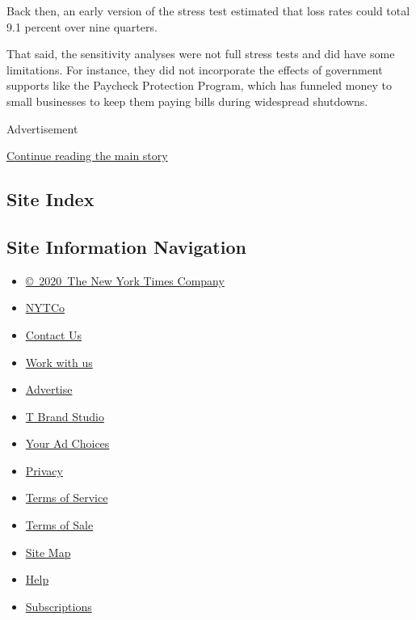 Back then, an early version of the stress test estimated that loss rates
could total 9.1 percent over nine quarters.

That said, the sensitivity analyses were not full stress tests and did
have some limitations. For instance, they did not incorporate the
effects of government supports like the Paycheck Protection Program,
which has funneled money to small businesses to keep them paying bills
during widespread shutdowns.

Advertisement

\protect\hyperlink{after-bottom}{Continue reading the main story}

\hypertarget{site-index}{%
\subsection{Site Index}\label{site-index}}

\hypertarget{site-information-navigation}{%
\subsection{Site Information
Navigation}\label{site-information-navigation}}

\begin{itemize}
\tightlist
\item
  \href{https://help.nytimes3xbfgragh.onion/hc/en-us/articles/115014792127-Copyright-notice}{©~2020~The
  New York Times Company}
\end{itemize}

\begin{itemize}
\tightlist
\item
  \href{https://www.nytco.com/}{NYTCo}
\item
  \href{https://help.nytimes3xbfgragh.onion/hc/en-us/articles/115015385887-Contact-Us}{Contact
  Us}
\item
  \href{https://www.nytco.com/careers/}{Work with us}
\item
  \href{https://nytmediakit.com/}{Advertise}
\item
  \href{http://www.tbrandstudio.com/}{T Brand Studio}
\item
  \href{https://www.nytimes3xbfgragh.onion/privacy/cookie-policy\#how-do-i-manage-trackers}{Your
  Ad Choices}
\item
  \href{https://www.nytimes3xbfgragh.onion/privacy}{Privacy}
\item
  \href{https://help.nytimes3xbfgragh.onion/hc/en-us/articles/115014893428-Terms-of-service}{Terms
  of Service}
\item
  \href{https://help.nytimes3xbfgragh.onion/hc/en-us/articles/115014893968-Terms-of-sale}{Terms
  of Sale}
\item
  \href{https://spiderbites.nytimes3xbfgragh.onion}{Site Map}
\item
  \href{https://help.nytimes3xbfgragh.onion/hc/en-us}{Help}
\item
  \href{https://www.nytimes3xbfgragh.onion/subscription?campaignId=37WXW}{Subscriptions}
\end{itemize}
